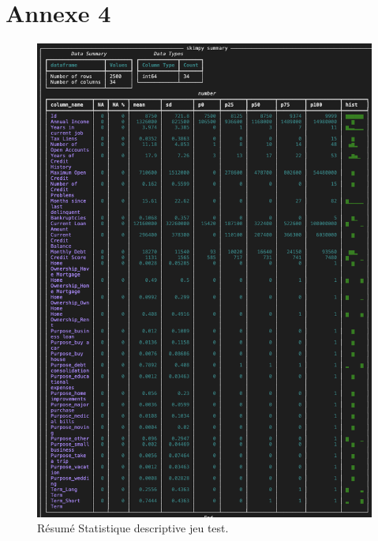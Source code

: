 \section*{Annexe 4}
\label{sec:annexe4}
\begin{figure}[H]
\centering
\includegraphics[width=1\textwidth]{figures/Annexe4.png}
\caption{Résumé Statistique descriptive jeu test.}
\label{fig:annexe4}
\end{figure}


